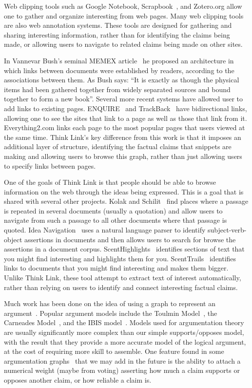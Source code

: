 \documentclass{chi2009}
\begin{document}
Web clipping tools such as Google Notebook, Scrapbook~\cite{scrapbook}, and Zotero.org allow one to gather and organize interesting from web pages. Many web clipping tools are also web annotation systems. These tools are designed for gathering and sharing interesting information, rather than for identifying the claims being made, or allowing users to navigate to related claims being made on other sites.

In Vannevar Bush's seminal MEMEX article~\cite{memex} he proposed an architecture in which links between documents were established by readers, according to the associations between them. As Bush says: ``It is exactly as though the physical items had been gathered together from widely separated sources and bound together to form a new book''. Several more recent systems have allowed user to add links to existing pages. ENQUIRE~\cite{weavingtheweb} and TrackBack~\cite{trackback} have bidirectional links, allowing one to see the sites that link to a page as well as those that link from it. Everything2.com links each page to the most popular pages that users viewed at the same time. Think Link's key difference from this work is that it imposes an additional layer of structure, identifying the factual claims that snippets are making and allowing users to browse this graph, rather than just allowing users to specify links between pages.

One of the goals of Think Link is that people should be able to browse information on the web through the ideas being expressed. This is a goal that is shared with several other projects. Kolak and Schilit~\cite{quotations} find places where a passage is repeated in several documents (usually a quotation) and allow users to navigate from such a passage to all other documents where that passage is quoted. Idea Navigation~\cite{ideanavigation} uses a natural language parser to identify subject-verb-object assertions in documents and then allows users to search for browse the assertions in a document corpus. ScentHighlights~\cite{Chi2005} identifies sections of text that you might find interesting and highlights them for you. ScentTrails~\cite{Olston2003} identifies links to documents that you might find interesting and makes them bigger. Unlike Think Link, these tool attempt to extract text of interest automatically, rather than relying on users to identify and connect interesting factual claims.

Much work has been done on the idea of using a graph to represent an argument~\cite{argumentation,argmas}. Popular argument models include the Toulmin Model~\cite{toulmin}, the Carneades Model~\cite{carneades}, and the IBIS model~\cite{ibis}. Models used for argumentation theory are usually significantly more complex than our simple supports/opposes model, with the result that they provide a more accurate model of the logical argument, at the cost of requiring more skill to assemble. One feature found in some argumentation graphs~\cite{Korb97acognitive} that we may add in the future is the ability to attach a numerical weight (maybe from voting) asserting how much a claim supports or opposes another claim, or how reliable a claim is.
\end{document}

